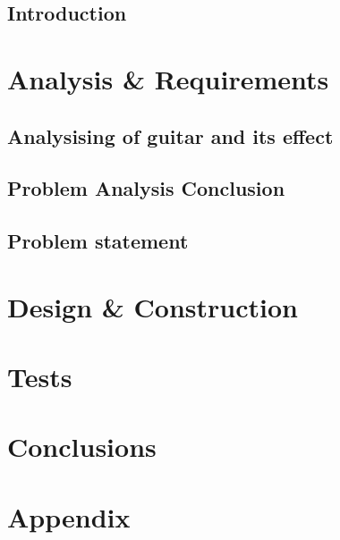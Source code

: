 \glsresetall
 \graphicspath{{figures/analysing/}}
\chapter{Introduction}

\part{Analysis \& Requirements}\label{pt:analysis} \glsresetall
 \graphicspath{{figures/analysing/}}
 \chapter{Analysising of guitar and its effect}\label{ch:analysing}
 
 

\label{sec:platform_comparing}

 \label{sec:FPGA}

 \label{sec:digital_vs_analog}

\chapter{Problem Analysis Conclusion}



\chapter{Problem statement}




\part{Design \& Construction}\label{pt:design} 
 
%
\part{Tests}\label{pt:tests} 
\part{Conclusions}\label{pt:conclusions} 
%

\glsresetall
 \graphicspath{{figures/appendix/}}
\part{Appendix}\label{pt:appendix}


